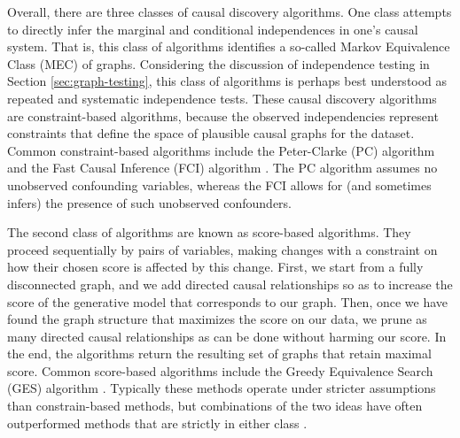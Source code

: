 Overall, there are three classes of causal discovery algorithms.
One class attempts to directly infer the marginal and conditional independences in one's causal system.
That is, this class of algorithms identifies a so-called Markov Equivalence Class (MEC) of graphs.
Considering the discussion of independence testing in Section \ref{sec:graph-testing}, this class of algorithms is perhaps best understood as repeated and systematic independence tests.
These causal discovery algorithms are constraint-based algorithms, because the observed independencies represent constraints that define the space of plausible causal graphs for the dataset.
Common constraint-based algorithms include the Peter-Clarke (PC) algorithm and the Fast Causal Inference (FCI) algorithm \citep{glymour_2001_causation}.
The PC algorithm assumes no unobserved confounding variables, whereas the FCI allows for (and sometimes infers) the presence of such unobserved confounders.

The second class of algorithms are known as score-based algorithms.
They proceed sequentially by pairs of variables, making changes with a constraint on how their chosen score is affected by this change.
First, we start from a fully disconnected graph, and we add directed causal relationships so as to increase the score of the generative model that corresponds to our graph.
Then, once we have found the graph structure that maximizes the score on our data, we prune as many directed causal relationships as can be done without harming our score.
In the end, the algorithms return the resulting set of graphs that retain maximal score.
Common score-based algorithms include the Greedy Equivalence Search (GES) algorithm \citep{chickering_2002_optimal}.
Typically these methods operate under stricter assumptions than constrain-based methods, but combinations of the two ideas have often outperformed methods that are strictly in either class \citep{glymour_2019_review}.

